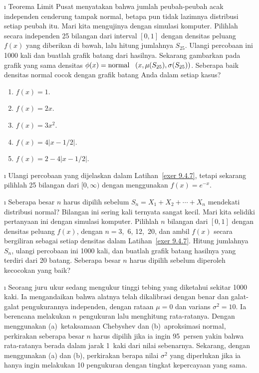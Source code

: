 \begin{LJSItem}
\i\label{exer 9.4.7} Teorema Limit Pusat menyatakan bahwa jumlah peubah-peubah acak independen
cenderung tampak normal, betapa pun tidak lazimnya distribusi setiap peubah itu.  Mari kita mengujinya
dengan simulasi komputer.  Pilihlah secara independen 25 bilangan dari interval $[0,1]$ dengan
densitas peluang $f(x)$ yang diberikan di bawah, lalu hitung jumlahnya $S_{25}$.  Ulangi percobaan ini
1000 kali dan buatlah grafik batang dari hasilnya.  Sekarang gambarkan pada grafik yang sama densitas
$\phi(x) = \mbox {normal \,\,\,}(x,\mu(S_{25}),\sigma(S_{25}))$.  Seberapa baik densitas normal
cocok dengan grafik batang Anda dalam setiap kasus?
\begin{enumerate}
\item  $f(x) = 1$.

\item  $f(x) = 2x$.

\item  $f(x) = 3x^2$.

\item  $f(x) = 4|x - 1/2|$.

\item  $f(x) = 2 - 4|x - 1/2|$.
\end{enumerate}

\i\label{exer 9.4.8}  Ulangi percobaan yang dijelaskan dalam Latihan~\ref{exer 9.4.7}, tetapi
sekarang pilihlah 25 bilangan dari $[0,\infty)$ dengan menggunakan $f(x) = e^{-x}$.

\i\label{exer 9.4.9}  Seberapa besar $n$ harus dipilih sebelum
$S_n = X_1 + X_2 +\cdots+ X_n$ mendekati distribusi normal?  Bilangan ini sering kali ternyata
sangat kecil.  Mari kita selidiki pertanyaan ini dengan simulasi komputer.  Pilihlah $n$ bilangan
dari $[0,1]$ dengan densitas peluang $f(x)$, dengan $n = 3$,~6, 12,~20, dan ambil $f(x)$ secara
bergiliran sebagai setiap densitas dalam Latihan~\ref{exer 9.4.7}.  Hitung jumlahnya $S_n$, ulangi
percobaan ini 1000 kali, dan buatlah grafik batang hasilnya yang terdiri dari 20 batang.  Seberapa
besar $n$ harus dipilih sebelum diperoleh kecocokan yang baik?

\i\label{exer 9.4.10}  Seorang juru ukur sedang mengukur tinggi tebing yang diketahui sekitar
1000 kaki.  Ia mengandaikan bahwa alatnya telah dikalibrasi dengan benar dan galat-galat pengukurannya
independen, dengan rataan $\mu = 0$ dan varians $\sigma^2 = 10$.  Ia berencana melakukan $n$
pengukuran lalu menghitung rata-ratanya.  Dengan menggunakan (a)~ketaksamaan Chebyshev dan
(b)~aproksimasi normal, perkirakan seberapa besar $n$ harus dipilih jika ia ingin 95~persen yakin
bahwa rata-ratanya berada dalam jarak 1~kaki dari nilai sebenarnya.  Sekarang, dengan menggunakan
(a) dan (b), perkirakan berapa nilai $\sigma^2$ yang diperlukan jika ia hanya ingin melakukan
10 pengukuran dengan tingkat kepercayaan yang sama.


\end{LJSItem}
